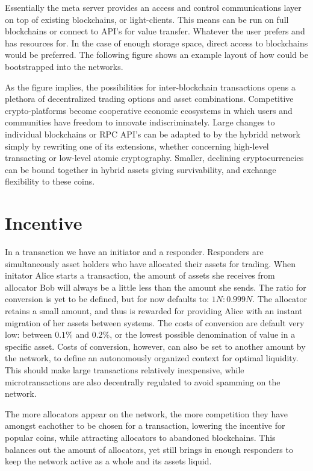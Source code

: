 \documentclass[a4paper]{article}
\begin{document}
Essentially the meta server provides an access and control communications layer on top of existing blockchains, or light-clients. This means \hybridd can be run on full blockchains or connect to API's for value transfer. Whatever the user prefers and has resources for. In the case of enough storage space, direct access to blockchains would be preferred. The following figure shows an example layout of how \hybridd could be bootstrapped into the networks.

As the figure implies, the possibilities for inter-blockchain transactions opens a plethora of decentralized trading options and asset combinations. Competitive crypto-platforms become cooperative economic ecosystems in which users and communities have freedom to innovate indiscriminately. Large changes to individual blockchains or RPC API's can be adapted to by the hybridd network simply by rewriting one of its extensions, whether concerning high-level transacting or low-level atomic cryptography. Smaller, declining cryptocurrencies can be bound together in hybrid assets giving survivability, and exchange flexibility to these coins.

\section{Incentive}

In a transaction we have an initiator and a responder. Responders are simultaneously asset holders who have allocated their assets for trading. When initator Alice starts a transaction, the amount of assets she receives from allocator Bob will always be a little less than the amount she sends. The ratio for conversion is yet to be defined, but for now defaults to: $1N : 0.999N$.  The allocator retains a small amount, and thus is rewarded for providing Alice with an instant migration of her assets between systems. The costs of conversion are default very low: between $0.1\%$ and $0.2\%$, or the lowest possible denomination of value in a specific asset. Costs of conversion, however, can also be set to another amount by the network, to define an autonomously organized context for optimal liquidity. This should make large transactions relatively inexpensive, while microtransactions are also decentrally regulated to avoid spamming on the network.

The more allocators appear on the network, the more competition they have amongst eachother to be chosen for a transaction, lowering the incentive for popular coins, while attracting allocators to abandoned blockchains. This balances out the amount of allocators, yet still brings in enough responders to keep the network active as a whole and its assets liquid.
\end{document}
